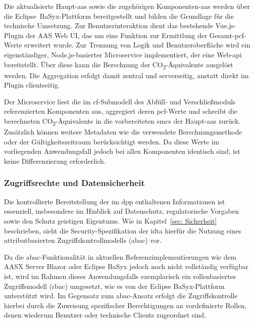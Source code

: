 Die aktualisierte Haupt-\acs{aas} sowie die zugehörigen Komponenten-\acs{aas} werden über die Eclipse~BaSyx-Plattform bereitgestellt und bilden die Grundlage für die technische Umsetzung.
Zur Benutzerinteraktion dient das bestehende Vue.js-Plugin der AAS Web UI, das um eine Funktion zur Ermittlung der Gesamt-\acs{pcf}-Werte erweitert wurde.
Zur Trennung von Logik und Benutzeroberfläche wird ein eigenständiger, Node.js-basierter Microservice implementiert, der eine Web-\acs{api} bereitstellt.
Über diese kann die Berechnung der CO\textsubscript{2}-Äquivalente ausgelöst werden.
Die Aggregation erfolgt damit zentral und serverseitig, anstatt direkt im Plugin clientseitig.

Der Microservice liest die im \acs{cf}-Submodell des Abfüll- und Verschließmoduls referenzierten Komponenten aus, aggregiert deren \acs{pcf}-Werte und schreibt die berechneten CO\textsubscript{2}-Äquivalente in die vorbereiteten \acsp{smc} der Haupt-\acs{aas} zurück.
Zusätzlich können weitere Metadaten wie die verwendete Berechnungsmethode oder der Gültigkeitszeitraum berücksichtigt werden.
Da diese Werte im vorliegenden Anwendungsfall jedoch bei allen Komponenten identisch sind, ist keine Differenzierung erforderlich.

\subsubsection{Zugriffsrechte und Datensicherheit}

Die kontrollierte Bereitstellung der im \acs{dpp} enthaltenen Informationen ist essenziell, insbesondere im Hinblick auf Datenschutz, regulatorische Vorgaben sowie den Schutz geistigen Eigentums.  
Wie in Kapitel~\ref{sec: Sicherheit} beschrieben, sieht die Security-Spezifikation der \acs{idta} hierfür die Nutzung eines attributbasierten Zugriffskontrollmodells (\acs{abac}) vor.

Da die \acs{abac}-Funktionalität in aktuellen Referenzimplementierungen wie dem AASX Server Blazor oder Eclipse BaSyx jedoch noch nicht vollständig verfügbar ist, wird im Rahmen dieses Anwendungsfalls exemplarisch ein rollenbasiertes Zugriffsmodell (\acs{rbac}) umgesetzt, wie es von der Eclipse BaSyx-Plattform unterstützt wird.  
Im Gegensatz zum \acs{abac}-Ansatz erfolgt die Zugriffskontrolle hierbei durch die Zuweisung spezifischer Berechtigungen an vordefinierte Rollen, denen wiederum Benutzer oder technische Clients zugeordnet sind.

